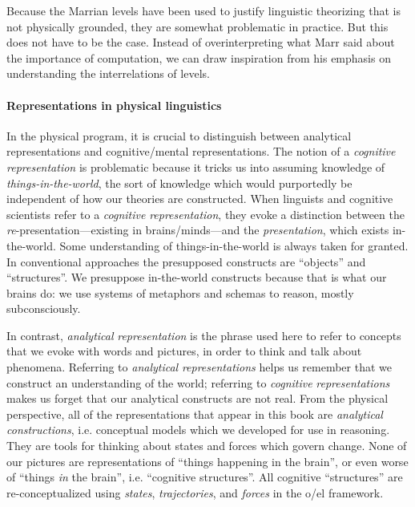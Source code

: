   Because the Marrian levels have been used to justify linguistic theorizing that is not physically grounded, they are somewhat problematic in practice. But this does not have to be the case. Instead of overinterpreting what Marr said about the importance of computation, we can draw inspiration from his emphasis on understanding the interrelations of levels. 

\paragraph{Representations in physical linguistics}

In the physical program, it is crucial to distinguish between analytical representations and cognitive/mental representations. The notion of a \textit{cognitive} \textit{representation} is problematic because it tricks us into assuming knowledge of \textit{things-in-the-world}, the sort of knowledge which would purportedly be independent of how our theories are constructed. When linguists and cognitive scientists refer to a \textit{cognitive} \textit{representation}, they evoke a distinction between the \textit{re}{}-presentation—existing in brains/minds—and the \textit{presentation}, which exists in-the-world. Some understanding of things-in-the-world is always taken for granted. In conventional approaches the presupposed constructs are “objects” and “structures”. We presuppose in-the-world constructs because that is what our brains do: we use systems of metaphors and schemas to reason, mostly subconsciously. 

  In contrast, \textit{analytical} \textit{representation} is the phrase used here to refer to concepts that we evoke with words and pictures, in order to think and talk about phenomena. Referring to \textit{analytical} \textit{representations} helps us remember that we construct an understanding of the world; referring to \textit{cognitive} \textit{representations} makes us forget that our analytical constructs are not real. From the physical perspective, all of the representations that appear in this book are \textit{analytical} \textit{constructions}, i.e. conceptual models which we developed for use in reasoning. They are tools for thinking about states and forces which govern change. None of our pictures are representations of “things happening in the brain”, or even worse of “things \textit{in} the brain”, i.e. “cognitive structures”. All cognitive “structures” are re-conceptualized using \textit{states}, \textit{trajectories}, and \textit{forces} in the o/el framework. 

